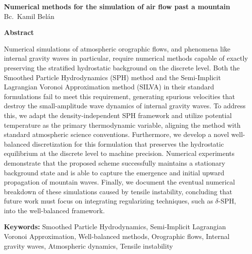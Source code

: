 \documentclass[11pt]{article}
\newcommand{\ThesisTitle}{Numerical methods for the simulation of air flow past a mountain}
\newcommand{\ThesisAuthor}{Bc.\ Kamil Belán}
\newcommand{\Keywords}{Smoothed Particle Hydrodynamics, Semi-Implicit Lagrangian Voronoi Approximation, Well-balanced methods, Orographic flows, Internal gravity waves, Atmospheric dynamics, Tensile instability}
\begin{document}
\begin{center}
  {\large\bfseries \ThesisTitle}\\[0.4em]
  {\normalsize \ThesisAuthor}
\end{center}

\bigskip
{\large\bfseries Abstract}\par\medskip
Numerical simulations of atmospheric orographic flows, and phenomena like internal gravity waves in particular, require numerical methods capable of exactly preserving the stratified hydrostatic background on the discrete level. Both the Smoothed Particle Hydrodynamics (SPH) method and the Semi-Implicit Lagrangian Voronoi Approximation method (SILVA) in their standard formulations fail to meet this requirement, generating spurious velocities that destroy the small-amplitude wave dynamics of internal gravity waves. To address this, we adapt the density-independent SPH framework and utilize potential temperature as the primary thermodynamic variable, aligning the method with standard atmospheric science conventions. Furthermore, we develop a novel well-balanced discretization for this formulation that preserves the hydrostatic equilibrium at the discrete level to machine precision. Numerical experiments demonstrate that the proposed scheme successfully maintains a stationary background state and is able to capture the emergence and initial upward propagation of mountain waves. Finally, we document the eventual numerical breakdown of these simulations caused by tensile instability, concluding that future work must focus on integrating regularizing techniques, such as $\delta$-SPH, into the well-balanced framework.

\bigskip
\noindent\textbf{Keywords:} \Keywords
\end{document}
